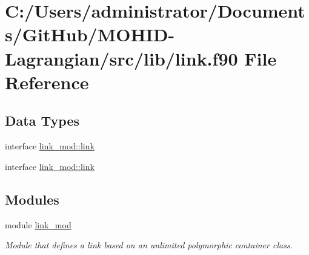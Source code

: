 \hypertarget{link_8f90}{}\section{C\+:/\+Users/administrator/\+Documents/\+Git\+Hub/\+M\+O\+H\+I\+D-\/\+Lagrangian/src/lib/link.f90 File Reference}
\label{link_8f90}
\subsection*{Data Types}
\begin{DoxyCompactItemize}
\item 
interface \mbox{\hyperlink{structlink__mod_1_1link}{link\+\_\+mod\+::link}}
\item 
interface \mbox{\hyperlink{structlink__mod_1_1link}{link\+\_\+mod\+::link}}
\end{DoxyCompactItemize}
\subsection*{Modules}
\begin{DoxyCompactItemize}
\item 
module \mbox{\hyperlink{namespacelink__mod}{link\+\_\+mod}}
\begin{DoxyCompactList}\small\item\em Module that defines a link based on an unlimited polymorphic container class. \end{DoxyCompactList}\end{DoxyCompactItemize}
